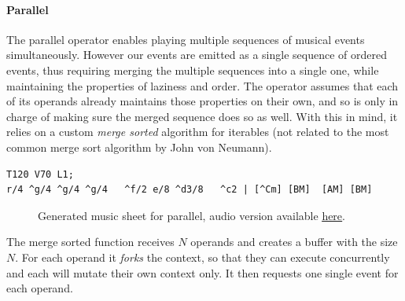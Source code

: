 \documentclass[a4paper,UKenglish,cleveref, autoref]{oasics-v2019}
\begin{document}
\newpage
\paragraph*{Parallel}
The parallel operator enables playing multiple sequences of musical events simultaneously. However our events are emitted as a single sequence of ordered events, thus requiring merging the multiple sequences into a single one, while maintaining the properties of laziness and order. The operator assumes that each of its operands already maintains those properties on their own, and so is only in charge of making sure the merged sequence does so as well. With this in mind, it relies on a custom \textit{merge sorted} algorithm for iterables (not related to the most common merge sort algorithm by John von Neumann).

\begin{lstlisting}[caption={Snippet of the song \textit{Soft to Be Strong} by Marina},label=list:6,captionpos=t,abovecaptionskip=-\medskipamount]
T120 V70 L1;
r/4 ^g/4 ^g/4 ^g/4   ^f/2 e/8 ^d3/8   ^c2 | [^Cm] [BM]  [AM] [BM] 
\end{lstlisting}

\begin{figure}[ht]
  \centering
  {%
  \setlength{\fboxsep}{0pt}%
  \setlength{\fboxrule}{0pt}%
  }%
  \caption{Generated music sheet for parallel, audio version available \href{https://drive.google.com/open?id=1ENTm3hZonYHyQIOgRZ8TQ1Qz-AfRLt2I}{\underline{here}}\protect\footnotemark.}
  \label{fig:parallel}
\end{figure}

The merge sorted function receives $N$ operands and creates a buffer with the size $N$. For each operand it \textit{forks} the context, so that they can execute concurrently and each will mutate their own context only. It then requests one single event for each operand.
\end{document}
